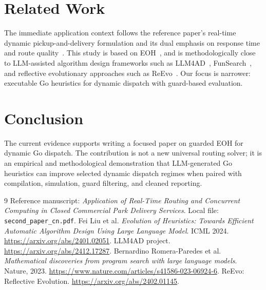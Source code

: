 \documentclass[11pt]{article}
\begin{document}


\section{Related Work}
The immediate application context follows the reference paper's real-time dynamic pickup-and-delivery formulation and its dual emphasis on response time and route quality~\cite{campus}. This study is based on EOH~\cite{eoh}, and is methodologically close to LLM-assisted algorithm design frameworks such as LLM4AD~\cite{llm4ad}, FunSearch~\cite{funsearch}, and reflective evolutionary approaches such as ReEvo~\cite{reevo}. Our focus is narrower: executable Go heuristics for dynamic dispatch with guard-based evaluation.

\section{Conclusion}
The current evidence supports writing a focused paper on guarded EOH for dynamic Go dispatch. The contribution is not a new universal routing solver; it is an empirical and methodological demonstration that LLM-generated Go heuristics can improve selected dynamic dispatch regimes when paired with compilation, simulation, guard filtering, and cleaned reporting.

\begin{thebibliography}{9}
 Reference manuscript: \textit{Application of Real-Time Routing and Concurrent Computing in Closed Commercial Park Delivery Services}. Local file: \texttt{second\_paper\_cn.pdf}.
 Fei Liu et al. \textit{Evolution of Heuristics: Towards Efficient Automatic Algorithm Design Using Large Language Model}. ICML 2024. \url{https://arxiv.org/abs/2401.02051}.
 LLM4AD project. \url{https://arxiv.org/abs/2412.17287}.
 Bernardino Romera-Paredes et al. \textit{Mathematical discoveries from program search with large language models}. Nature, 2023. \url{https://www.nature.com/articles/s41586-023-06924-6}.
 ReEvo: Reflective Evolution. \url{https://arxiv.org/abs/2402.01145}.
\end{thebibliography}
\end{document}
